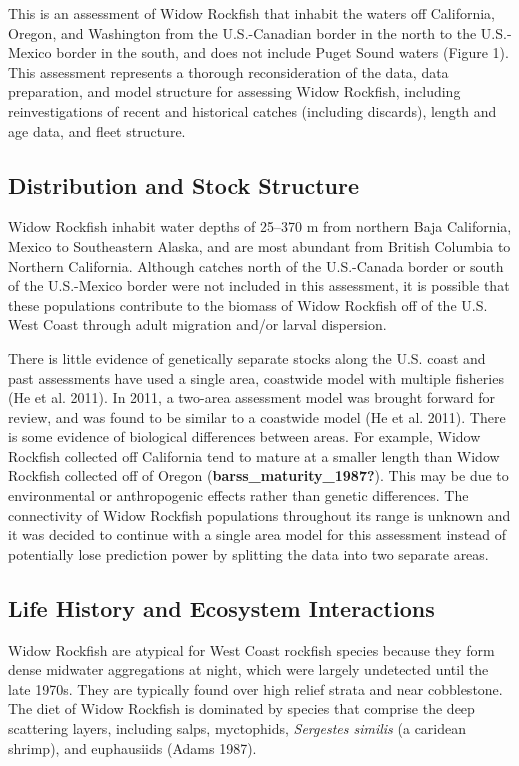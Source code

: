 \documentclass[
]{scrartcl}
\begin{document}
This is an assessment of Widow Rockfish that inhabit the waters off
California, Oregon, and Washington from the U.S.-Canadian border in the
north to the U.S.-Mexico border in the south, and does not include Puget
Sound waters (Figure 1). This assessment represents a thorough
reconsideration of the data, data preparation, and model structure for
assessing Widow Rockfish, including reinvestigations of recent and
historical catches (including discards), length and age data, and fleet
structure.

\subsection{Distribution and Stock
Structure}\label{distribution-and-stock-structure}

Widow Rockfish inhabit water depths of 25--370 m from northern Baja
California, Mexico to Southeastern Alaska, and are most abundant from
British Columbia to Northern California. Although catches north of the
U.S.-Canada border or south of the U.S.-Mexico border were not included
in this assessment, it is possible that these populations contribute to
the biomass of Widow Rockfish off of the U.S. West Coast through adult
migration and/or larval dispersion.

There is little evidence of genetically separate stocks along the U.S.
coast and past assessments have used a single area, coastwide model with
multiple fisheries (He et al. 2011). In 2011, a two-area assessment
model was brought forward for review, and was found to be similar to a
coastwide model (He et al. 2011). There is some evidence of biological
differences between areas. For example, Widow Rockfish collected off
California tend to mature at a smaller length than Widow Rockfish
collected off of Oregon (\textbf{barss\_maturity\_1987?}). This may be
due to environmental or anthropogenic effects rather than genetic
differences. The connectivity of Widow Rockfish populations throughout
its range is unknown and it was decided to continue with a single area
model for this assessment instead of potentially lose prediction power
by splitting the data into two separate areas.

\subsection{Life History and Ecosystem
Interactions}\label{life-history-and-ecosystem-interactions}

Widow Rockfish are atypical for West Coast rockfish species because they
form dense midwater aggregations at night, which were largely undetected
until the late 1970s. They are typically found over high relief strata
and near cobblestone. The diet of Widow Rockfish is dominated by species
that comprise the deep scattering layers, including salps, myctophids,
\emph{Sergestes similis} (a caridean shrimp), and euphausiids (Adams
1987).
\end{document}
